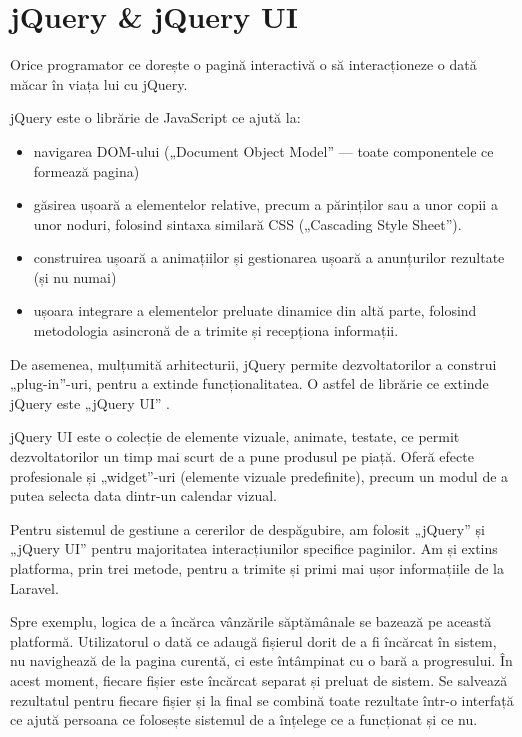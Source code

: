 \section{jQuery \& jQuery UI}

	Orice programator ce dorește o pagină interactivă o să interacționeze o dată măcar în viața lui cu jQuery.\cite{jquery}

	jQuery este o librărie de JavaScript ce ajută la:
	\begin{itemize}
		\item navigarea DOM-ului („Document Object Model” --- toate componentele ce formează pagina)
		\item găsirea ușoară a elementelor relative, precum a părinților sau a unor copii a unor noduri, folosind sintaxa similară CSS („Cascading Style Sheet”).
		\item construirea ușoară a animațiilor și gestionarea ușoară a anunțurilor rezultate (și nu numai)
		\item ușoara integrare a elementelor preluate dinamice din altă parte, folosind metodologia asincronă de a trimite și recepționa informații.
	\end{itemize}

	De asemenea, mulțumită arhitecturii, jQuery permite dezvoltatorilor a construi „plug-in”-uri, pentru a extinde funcționalitatea.
	O astfel de librărie ce extinde jQuery este „jQuery UI” \cite{jquery_ui}.

	jQuery UI este o colecție de elemente vizuale, animate, testate, ce permit dezvoltatorilor un timp mai scurt de a pune produsul pe piață.
	Oferă efecte profesionale și „widget”-uri (elemente vizuale predefinite), precum un modul de a putea selecta data dintr-un calendar vizual.

	Pentru sistemul de gestiune a cererilor de despăgubire, am folosit „jQuery” și „jQuery UI” pentru majoritatea interacțiunilor specifice paginilor.
	Am și extins platforma, prin trei metode, pentru a trimite și primi mai ușor informațiile de la Laravel.

	Spre exemplu, logica de a încărca vânzările săptămânale se bazează pe această platformă.
	Utilizatorul o dată ce adaugă fișierul dorit de a fi încărcat în sistem, nu navighează de la pagina curentă, ci este întâmpinat cu o bară a progresului.
	În acest moment, fiecare fișier este încărcat separat și preluat de sistem.
	Se salvează rezultatul pentru fiecare fișier și la final se combină toate rezultate într-o interfață ce ajută persoana ce folosește sistemul de a înțelege ce a funcționat și ce nu.

